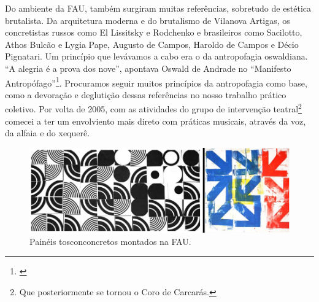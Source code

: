 Do ambiente da FAU, também surgiram muitas referências, sobretudo de estética brutalista. Da arquitetura moderna e do brutalismo de Vilanova Artigas, os concretistas russos como El Lissitsky e Rodchenko e brasileiros como Sacilotto, Athos Bulcão e Lygia Pape, Augusto de Campos, Haroldo de Campos e Décio Pignatari. Um princípio que levávamos a cabo era o da antropofagia oswaldiana.  ``A alegria é a prova dos nove'', apontava Oswald de Andrade no ``Manifesto Antropófago''\footnote{\cite{Andrade1928}}. Procuramos seguir muitos princípios da antropofagia como base, como a devoração e deglutição dessas referências no nosso trabalho prático coletivo. Por volta de 2005, com as atividades do grupo de intervenção teatral\footnote{Que posteriormente se tornou o Coro de Carcarás.} comecei a ter um envolviento mais direto com práticas musicais, através da voz, da alfaia e do xequerê. 




\begin{figure}

\includegraphics[width=1\textwidth]{pictures/cap1/tosconcreto}
\caption{Painéis tosconconcretos montados na FAU.}
\label{fig:tosconcreto}
\end{figure}

